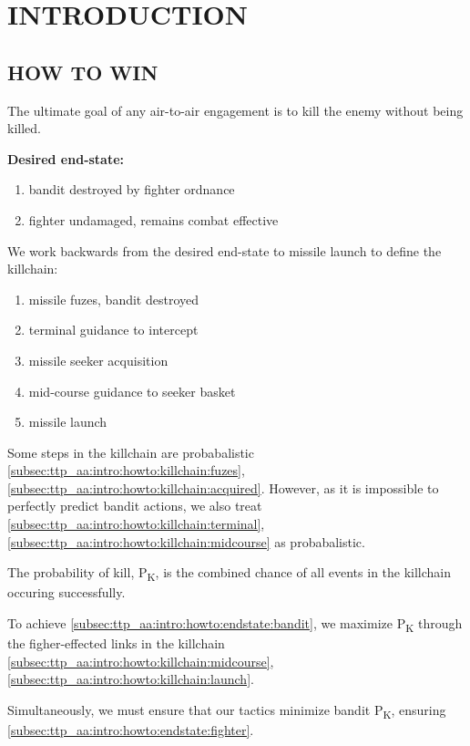 \section{INTRODUCTION}
\subsection{HOW TO WIN}
\begin{tcoloritemize}
    \blueitem[Goal]
    The ultimate goal of any air-to-air engagement is to kill the enemy without being killed. 

    \medskip
    \textbf{Desired end-state:}
    \begin{enumerate}[label=\bfseries(\arabic*)]
        \item bandit destroyed by fighter ordnance
        \label{subsec:ttp_aa:intro:howto:endstate:bandit}
        \item fighter undamaged, remains combat effective
        \label{subsec:ttp_aa:intro:howto:endstate:fighter}
    \end{enumerate}

    We work backwards from the desired end-state 
    to missile launch to define the killchain:
    \begin{enumerate}[label=\textbf{(\alph*)}]
        \item missile fuzes, bandit destroyed
        \label{subsec:ttp_aa:intro:howto:killchain:fuzes}
        \item terminal guidance to intercept
        \label{subsec:ttp_aa:intro:howto:killchain:terminal}
        \item missile seeker acquisition
        \label{subsec:ttp_aa:intro:howto:killchain:acquired}
        \item mid-course guidance to seeker basket
        \label{subsec:ttp_aa:intro:howto:killchain:midcourse}
        \item missile launch
        \label{subsec:ttp_aa:intro:howto:killchain:launch}
    \end{enumerate}

    Some steps in the killchain are probabalistic 
    \ref{subsec:ttp_aa:intro:howto:killchain:fuzes},
    \ref{subsec:ttp_aa:intro:howto:killchain:acquired}.
    However, as it is impossible to perfectly predict bandit actions, 
    we also treat 
    \ref{subsec:ttp_aa:intro:howto:killchain:terminal},
    \ref{subsec:ttp_aa:intro:howto:killchain:midcourse}
    as probabalistic.

    \medskip
    The probability of kill, P\textsubscript{K}, is the combined chance of all events in the killchain occuring successfully.

    To achieve \ref{subsec:ttp_aa:intro:howto:endstate:bandit},
    we maximize P\textsubscript{K} through the figher-effected links in the killchain
    \ref{subsec:ttp_aa:intro:howto:killchain:midcourse},
    \ref{subsec:ttp_aa:intro:howto:killchain:launch}.

    \medskip
    Simultaneously, we must ensure that our tactics minimize bandit P\textsubscript{K}, 
    ensuring \ref{subsec:ttp_aa:intro:howto:endstate:fighter}.
\end{tcoloritemize}

